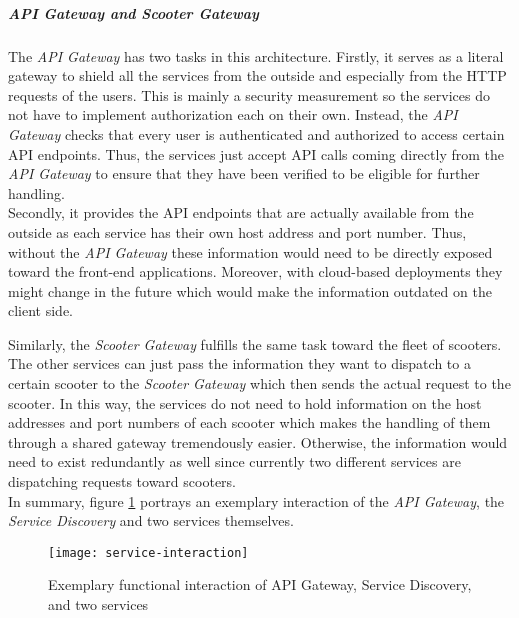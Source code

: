 \documentclass[12pt,a4paper,twoside]{report}
\begin{document}
\subparagraph{API Gateway and Scooter Gateway}
The \textit{API Gateway} has two tasks in this architecture.
Firstly, it serves as a literal gateway to shield all the services from
the outside and especially from the HTTP requests of the users.
This is mainly a security measurement so the services do not have to
implement authorization each on their own. Instead, the \textit{API Gateway}
checks that every user is authenticated and authorized to access certain
API endpoints. Thus, the services just accept API calls coming directly from
the \textit{API Gateway} to ensure that they have been verified to be eligible
for further handling.\\
Secondly, it provides the API endpoints that are actually available from the
outside as each service has their own host address and port number.
Thus, without the \textit{API Gateway} these information would need to be
directly exposed toward the front-end applications. Moreover, with cloud-based
deployments they might change in the future which would make the information
outdated on the client side.

Similarly, the \textit{Scooter Gateway} fulfills the same task toward the
fleet of scooters. The other services can just pass the
information they want to dispatch to a certain scooter to the
\textit{Scooter Gateway} which then sends the actual request to the scooter.
In this way, the services do not need to hold information on the host addresses
and port numbers of each scooter which makes the handling of them through
a shared gateway tremendously easier. Otherwise, the information would need
to exist redundantly as well since currently two different services are
dispatching requests toward scooters.\\

In summary, figure \ref{fig:service-interaction} portrays an exemplary interaction of the
\textit{API Gateway}, the \textit{Service Discovery} and two services themselves.

\begin{figure}[htb]
\centering
\texttt{[image: service-interaction]}
\caption{Exemplary functional interaction of API Gateway, Service Discovery, and two services}
\label{fig:service-interaction}
\end{figure}
\end{document}
